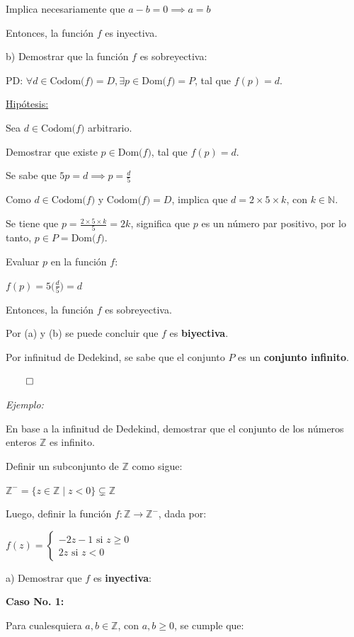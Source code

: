 \documentclass{article}
\begin{document}
Implica necesariamente que $a - b = 0 \implies a = b$

Entonces, la función $f$ es inyectiva.

b) Demostrar que la función $f$ es sobreyectiva:

PD: $\forall d \in \text{Codom($f$)} = D, \exists p \in \text{Dom($f$)} = P$, tal que $f(p) = d$.

\underline{Hipótesis:}

Sea $d \in \text{Codom($f$)}$ arbitrario.

Demostrar que existe $p \in \text{Dom($f$)}$, tal que $f(p) = d$.

Se sabe que $\displaystyle 5p = d \implies p = \frac{d}{5}$

Como $d \in \text{Codom($f$)}$ y $\text{Codom($f$)} = D$, implica que $d = 2 \times 5 \times k$, con $k \in \mathbb{N}$.

Se tiene que $\displaystyle p = \frac{2 \times 5 \times k}{5} = 2k$, significa que $p$ es un número par positivo, por lo tanto, $p \in P = \text{Dom($f$)}$.

Evaluar $p$ en la función $f$:

$\displaystyle f(p) = 5\Big(\frac{d}{5}\Big) = d$

Entonces, la función $f$ es sobreyectiva.

Por (a) y (b) se puede concluir que $f$ es \textbf{biyectiva}.

Por infinitud de Dedekind, se sabe que el conjunto $P$ es un \textbf{conjunto infinito}.

$\qed$

\textit{Ejemplo:}

En base a la infinitud de Dedekind, demostrar que el conjunto de los números enteros $\mathbb{Z}$ es infinito.

Definir un subconjunto de $\mathbb{Z}$ como sigue:

$\mathbb{Z}^- = \{z \in \mathbb{Z} \mid z < 0\} \subsetneq \mathbb{Z}$

Luego, definir la función $f: \mathbb{Z} \to \mathbb{Z}^-$, dada por:

$
f(z) = 
\begin{cases}
    -2z - 1 \text{ si } z \ge 0 \\
    2z \text{ si } z < 0
\end{cases}
$

a) Demostrar que $f$ es \textbf{inyectiva}:

\textbf{Caso No. 1:} 

Para cualesquiera $a, b \in \mathbb{Z}$, con $a, b \ge 0$, se cumple que:
\end{document}
